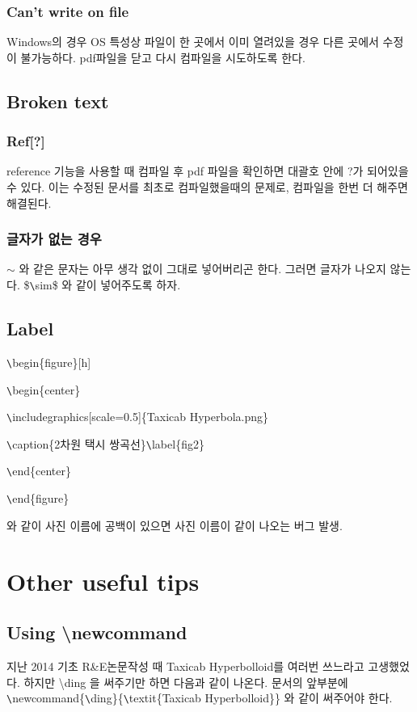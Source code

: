 \documentclass[11pt]{article}
\begin{document}
\subsubsection{Can't write on file}
Windows의 경우 OS 특성상 파일이 한 곳에서 이미 열려있을 경우 다른 곳에서 수정이 불가능하다.
pdf파일을 닫고 다시 컴파일을 시도하도록 한다.


\subsection{Broken text}
\subsubsection{Ref[?]}
reference 기능을 사용할 때 컴파일 후 pdf 파일을 확인하면 대괄호 안에 ?가 되어있을수 있다. 이는 수정된 문서를 최초로 컴파일했을때의 문제로, 컴파일을 한번 더 해주면 해결된다.
\subsubsection{글자가 없는 경우}
$\sim$ 와 같은 문자는 아무 생각 없이 그대로 넣어버리곤 한다. 그러면 글자가 나오지 않는다. 
\$\verb+\+sim\$ 와 같이 넣어주도록 하자.


\subsection{Label}
\verb+\+begin\{figure\}[h]

\verb+\+begin\{center\}

\verb+\+includegraphics[scale=0.5]\{Taxicab Hyperbola.png\} 

\verb+\+caption\{2차원 택시 쌍곡선\}\verb+\+label\{fig2\}

\verb+\+end\{center\}

\verb+\+end\{figure\}

와 같이 사진 이름에 공백이 있으면 사진 이름이 같이 나오는 버그 발생.

\section{Other useful tips}
\subsection{Using \textbackslash newcommand}
지난 2014 기초 R\&E논문작성 때 Taxicab Hyperbolloid를 여러번 쓰느라고 고생했었다.
하지만 \textbackslash ding 을 써주기만 하면 다음과 같이 나온다. 
문서의 앞부분에 \verb+\+newcommand\{\verb+\+ding\}\{\verb+\+textit\{Taxicab Hyperbolloid\}\} 와 같이 써주어야 한다. 
\ding
\end{document}
